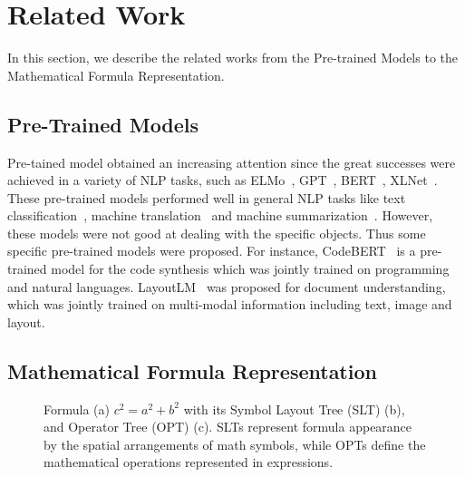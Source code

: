 \documentclass{article}
\begin{document}
\section{Related Work}
In this section, we describe the related works from the Pre-trained Models to the Mathematical Formula Representation.


\subsection{Pre-Trained Models}

Pre-tained model obtained an increasing attention since the great successes were achieved in a variety of NLP tasks, such as ELMo~\cite{ELMo}, GPT~\cite{GPT}, BERT~\cite{BERT}, XLNet~\cite{XLNet}. These pre-trained models performed well in general NLP tasks like text classification~\cite{BERT}, machine translation~\cite{BERT-fused,sundararaman2019syntax} and machine summarization~\cite{miller2019leveraging,xenouleas2019sumqe}. However, these models were not good at dealing with the specific objects. Thus some specific pre-trained models were proposed. For instance, CodeBERT~\cite{codebert} is a pre-trained model for the code synthesis which was jointly trained on programming and natural languages. LayoutLM~\cite{LayoutLM} was proposed for document understanding, which was jointly trained on multi-modal information including text, image and layout. 

\subsection{Mathematical Formula Representation}

\begin{figure}[h]
    \vskip -0.1in
    \centering
    \vskip -0.1in
    \caption{Formula (a) $c^2=a^2+b^2$ with its Symbol Layout
Tree (SLT) (b), and Operator Tree (OPT) (c). SLTs represent formula appearance by the spatial arrangements of math symbols, while OPTs
define the mathematical operations represented in expressions.}
    \label{fig:slt_opt}
    \vskip -0.1in
\end{figure}
\end{document}
